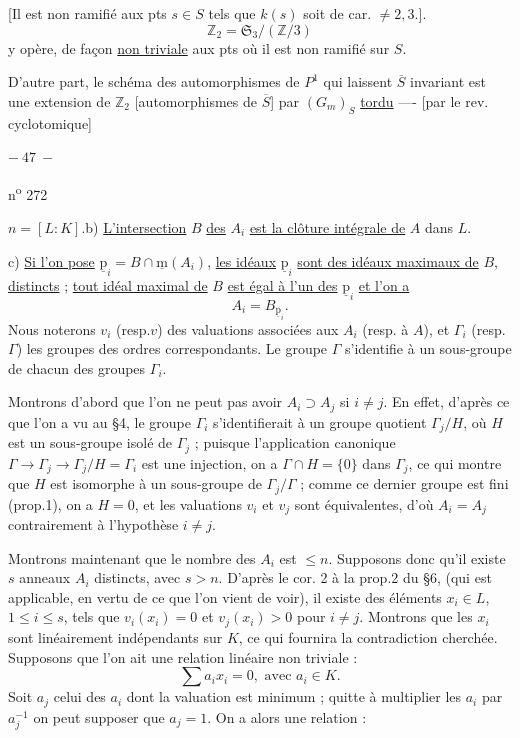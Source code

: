 [Il est non ramifié  aux pts $s\in S$ tels que $k(s)$ soit de car. $\ne2,3$.].
\[
\mathbb Z_2=\mathfrak S_3/(\mathbb Z/3)
\]
y opère, de façon \uline{non triviale} aux pts où il est non ramifié sur $S$.

D'autre part, le schéma  des automorphismes de $P^1$ qui laissent $\overline S$  invariant est une extension de $\mathbb Z_2$ [automorphismes de $\overline S$] par $(G_m)_S$ \uline{tordu} ---- [par le rev. cyclotomique]


\begin{center}$-\ 47\ -$\end{center}\hfill n\textsuperscript{o} 272

$n=[L:K]$.\quad b) \uline{L'intersection} $B$ \uline{des} $A_i$ \uline{est la clôture intégrale de} $A$ dans $L$.

c) \uline{Si l'on pose} $\underline{\mathrm p}_i=B\cap\underline{\mathrm m}(A_i)$, \uline{les idéaux} $\underline{\mathrm p}_i$ \uline{sont des idéaux maximaux de} $B$, \uline{distincts} ; \uline{tout idéal maximal de} $B$ \uline{est égal à l'un des} $\underline{\mathrm p}_i$ \uline{et l'on a}
\[
A_i=B_{\underline{\mathrm p}_i}.
\]
Nous noterons $v_i$ (resp.$v$) des valuations associées aux $A_i$ (resp. à $A$), et $\Gamma_i$ (resp.$\Gamma$) les groupes des ordres correspondants. Le groupe $\Gamma$ s'identifie à un sous-groupe de chacun des groupes $\Gamma_i$.

Montrons d'abord que l'on ne peut pas avoir $A_i\supset A_j$ si $i\ne j$. En effet, d'après ce que l'on a vu au \S4, le groupe $\Gamma_i$ s'identifierait à un groupe quotient $\Gamma_j/H$, où $H$ est un sous-groupe isolé de $\Gamma_j$ ; puisque l'application canonique $\Gamma\longrightarrow\Gamma_j\longrightarrow\Gamma_j/H=\Gamma_i$ est une injection, on a $\Gamma\cap H=\{0\}$ dans $\Gamma_j$, ce qui montre que $H$ est isomorphe à un sous-groupe de $\Gamma_j/\Gamma$ ; comme ce dernier groupe est fini (prop.1), on a $H=0$, et les valuations $v_i$ et $v_j$ sont équivalentes, d'où $A_i=A_j$ contrairement à l'hypothèse $i\ne j$.

Montrons maintenant que le nombre des $A_i$ est  $\leqslant n$. Supposons donc qu'il existe $s$ anneaux $A_i$ distincts, avec $s>n$. D'après le cor. 2 à la prop.2 du \S6, (qui est applicable, en vertu de ce que l'on vient de voir), il existe des éléments $x_i\in L$, $1\leqslant i\leqslant s$, tels que $v_i(x_i)=0$ et $v_j(x_i)>0$ pour $i\ne j$. Montrons que les $x_i$ sont linéairement indépendants sur $K$, ce qui fournira la contradiction cherchée. Supposons que l'on ait une relation linéaire non triviale :
\[
\sum a_ix_i=0,\text{ avec }a_i\in K.
\]
Soit $a_j$ celui des $a_i$ dont la valuation est minimum ; quitte à multiplier les $a_i$ par $a_j^{-1}$ on peut supposer que $a_j=1$. On a alors une relation :

